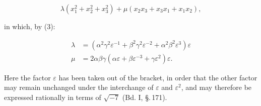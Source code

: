 \[
\lambda(x_1^2+x_2^2+x_3^2) + \mu(x_2x_3+x_3x_1+x_1x_2),
\]

in which, by (3):

\[
\begin{aligned}
\lambda &= (\alpha^2\gamma^2\varepsilon^{-1} + \beta^2\gamma^2\varepsilon^{-2} + \alpha^2\beta^2\varepsilon^3)\varepsilon \\
\mu &= 2\alpha\beta\gamma(\alpha\varepsilon+\beta\varepsilon^{-3}+\gamma\varepsilon^2)\varepsilon.
\end{aligned}
\]

Here the factor $\varepsilon$ has been taken out of the bracket, in order that the other factor may remain unchanged under the interchange of $\varepsilon$ and $\varepsilon^2$, and may therefore be expressed rationally in terms of $\sqrt{-7}$ (Bd. I, \S.\,171).
